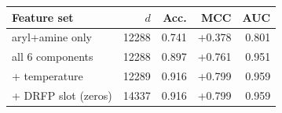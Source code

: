 \begin{tabular}{lrrrr}
\toprule
Feature set & $d$ & Acc. & MCC & AUC \\
\midrule
aryl+amine only & 12288 & 0.741 & +0.378 & 0.801 \\
all 6 components & 12288 & 0.897 & +0.761 & 0.951 \\
+ temperature & 12289 & 0.916 & +0.799 & 0.959 \\
+ DRFP slot (zeros) & 14337 & 0.916 & +0.799 & 0.959 \\
\bottomrule
\end{tabular}